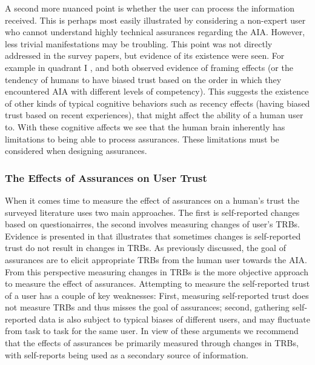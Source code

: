     A second more nuanced point is whether the user can process the information received. This is perhaps most easily illustrated by considering a non-expert user who cannot understand highly technical assurances regarding the AIA. However, less trivial manifestations may be troubling. This point was not directly addressed in the survey papers, but evidence of its existence were seen. For example in quadrant I \cite{Riley1996-qm}, and \cite{Freedy2007-sg} both observed evidence of framing effects (or the tendency of humans to have biased trust based on the order in which they encountered AIA with different levels of competency). This suggests the existence of other kinds of typical cognitive behaviors such as recency effects (having biased trust based on recent experiences), that might affect the ability of a human user to. With these cognitive affects we see that the human brain inherently has limitations to being able to process assurances. These limitations must be considered when designing assurances.

\subsubsection{The Effects of Assurances on User Trust}
    When it comes time to measure the effect of assurances on a human's trust the surveyed literature uses two main approaches. The first is self-reported changes based on questionairres, the second involves measuring changes of user's TRBs. Evidence is presented in \cite{Dzindolet2003-ts} that illustrates that sometimes changes is self-reported trust do not result in changes in TRBs. As previously discussed, the goal of assurances are to elicit appropriate TRBs from the human user towards the AIA. From this perspective measuring changes in TRBs is the more objective approach to measure the effect of assurances. Attempting to measure the self-reported trust of a user has a couple of key weaknesses: First, measuring self-reported trust does not measure TRBs and thus misses the goal of assurances; second, gathering self-reported data is also subject to typical biases of different users, and may fluctuate from task to task for the same user. In view of these arguments we recommend that the effects of assurances be primarily measured through changes in TRBs, with self-reports being used as a secondary source of information.
